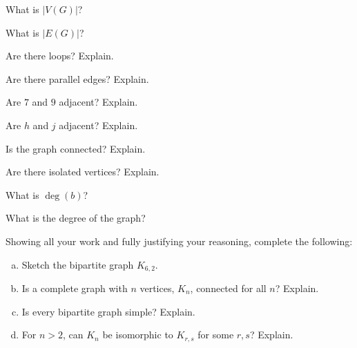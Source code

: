 \documentclass[12pt,letterpaper]{exam}
\begin{document}
\begin{questions}
\begin{2enumerate}
\item What is $|V(G)|$?
\item What is $|E(G)|$?
\item Are there loops? Explain. 
\item Are there parallel edges? Explain. 
\item Are $7$ and $9$ adjacent? Explain. 
\item Are $h$ and $j$ adjacent? Explain. 
\item Is the graph connected? Explain. 
\item Are there isolated vertices? Explain. 
\item What is $\deg(b)$?
\item What is the degree of the graph?
\end{2enumerate}



\newpage



\newpage
\question[10] Showing all your work and fully justifying your reasoning, complete the following:
	\begin{enumerate}[(a)]
	\item Sketch the bipartite graph $K_{6,2}$.
	\item Is a complete graph with $n$ vertices, $K_n$, connected for all $n$? Explain. 
	\item Is every bipartite graph simple? Explain. 
	\item For $n > 2$, can $K_n$ be isomorphic to $K_{r, s}$ for some $r, s$? Explain. 
	\end{enumerate}



\newpage




\end{questions}
\end{document}
